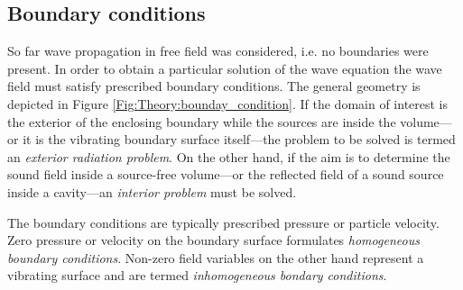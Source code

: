 \subsection{Boundary conditions}
\label{Section:Theory:Boundary_conditions}

So far wave propagation in free field was considered, i.e. no boundaries were present.
In order to obtain a particular solution of the wave equation the wave field must satisfy prescribed boundary conditions.
The general geometry is depicted in Figure \ref{Fig:Theory:bounday_condition}.
If the domain of interest is the exterior of the enclosing boundary while the sources are inside the volume---or it is the vibrating boundary surface itself---the problem to be solved is termed an \emph{exterior radiation problem}. 
On the other hand, if the aim is to determine the sound field inside a source-free volume---or the reflected field of a sound source inside a cavity---an \emph{interior problem} must be solved.

The boundary conditions are typically prescribed pressure or particle velocity. 
Zero pressure or velocity on the boundary surface formulates \emph{homogeneous boundary conditions}. 
Non-zero field variables on the other hand represent a vibrating surface and are termed \emph{inhomogeneous bondary conditions}.

